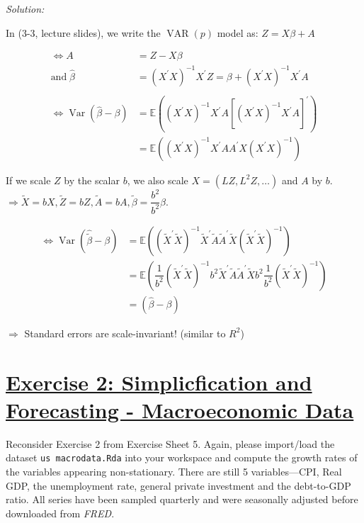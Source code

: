\documentclass[12pt,a4paper]{article}
\newcommand{\Var}{\operatorname{Var}} %
\newcommand{\VAR}{\operatorname{VAR}} %
\newcommand{\tmpsection}[1]{}
\let\tmpsection=\section
\renewcommand{\section}[1]{\tmpsection{\underline{#1}} }
\begin{document}
\emph{Solution:}

In (3-3, lecture slides), we write the \(\VAR(p)\) model as:
\(Z = X\beta + A\)

\begin{align*}
  \Leftrightarrow A & = Z - X \beta \\
  \text{and} \;\hat{\beta} & = \left( X^{'} X\right)^{-1} X^{'} Z = \beta + \left( X^{'} X\right)^{-1} X^{'} A \\
  \\
  \Leftrightarrow  \Var \left( \hat{\beta} - \beta \right) & = \mathbb{E} \left( \left(X^{'} X \right)^{-1}  X^{'} A \left[ (X^{'} X)^{-1} X^{'} A \right]^{'} \right) \\
  & = \mathbb{E} \left( \left(X^{'} X \right)^{-1}  X^{'} A  A^{'} X \left(X^{'} X \right)^{-1} \right)
\end{align*}

If we scale \(Z\) by the scalar \(b\), we also scale
\(X = \left(LZ, L^2 Z, \ldots \right)\) and \(A\) by \(b\).
\(\Rightarrow \tilde{X} = bX, \tilde{Z} = bZ, \tilde{A} = bA, \tilde{\beta} = \dfrac{b^2}{b^2} \beta\).

\begin{align*}
  \Leftrightarrow \Var \left( \hat{\tilde{\beta}} - \beta \right) & = \mathbb{E} \left(\left(\tilde{X}^{'} \tilde{X} \right)^{-1} \tilde{X}^{'} \tilde{A} \tilde{A}^{'} \tilde{X} \left(\tilde{X}^{'} \tilde{X} \right)^{-1} \right)\\
   & = \mathbb{E} \left( \dfrac{1}{b^2} \left(\tilde{X}^{'} \tilde{X} \right)^{-1} b^2 \tilde{X}^{'} \tilde{A} \tilde{A}^{'} \tilde{X} b^2  \dfrac{1}{b^2}\left(\tilde{X}^{'} \tilde{X} \right)^{-1} \right) \\
   & = \left( \hat{\beta} - \beta \right)
\end{align*}

\(\Rightarrow\) Standard errors are scale-invariant! (similar to
\(R^2\))

\hypertarget{exercise-2-simplicfication-and-forecasting---macroeconomic-data}{%
\section{Exercise 2: Simplicfication and Forecasting - Macroeconomic
Data}\label{exercise-2-simplicfication-and-forecasting---macroeconomic-data}}

Reconsider Exercise 2 from Exercise Sheet 5. Again, please import/load
the dataset \texttt{us\ macrodata.Rda} into your workspace and compute
the growth rates of the variables appearing non-stationary. There are
still 5 variables---CPI, Real GDP, the unemployment rate, general
private investment and the debt-to-GDP ratio. All series have been
sampled quarterly and were seasonally adjusted before downloaded from
\emph{FRED}.
\end{document}
